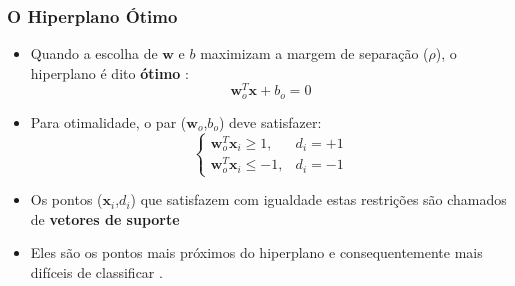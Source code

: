 \documentclass{beamer}
\begin{document}


\begin{frame}
	\frametitle{O Hiperplano Ótimo}
	\begin{itemize}
		\item Quando a escolha de $\textbf{w}$ e $b$ maximizam a margem de separação ($\rho$), o hiperplano é dito \textbf{ótimo} \cite{haykin}:
		\begin{equation}
			\textbf{w}^T_o\textbf{x} + b_o = 0
			\label{eq:plano-opt}
		\end{equation}		

		\item Para otimalidade, o par ($\textbf{w}_o$,$b_o$) deve satisfazer:
		\begin{equation}
		\begin{cases}
			\textbf{w}^T_o\textbf{x}_i \geq 1, & d_i = +1 \\ 
			\textbf{w}^T_o\textbf{x}_i \leq -1, & d_i = -1
		\end{cases}
		\label{eq:plano-cond}
		\end{equation}
		\item Os pontos ($\textbf{x}_i$,$d_i$) que satisfazem com igualdade estas restrições são chamados de \textbf{vetores de suporte}
		\item Eles são os pontos mais próximos do hiperplano e consequentemente mais difíceis de classificar \cite{haykin}.
	\end{itemize}

\end{frame}
\end{document}
